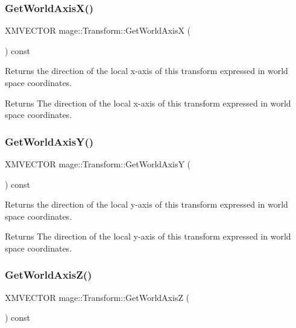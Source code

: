 \subsubsection{\texorpdfstring{Get\+World\+Axis\+X()}{GetWorldAxisX()}}
{\footnotesize\ttfamily X\+M\+V\+E\+C\+T\+OR mage\+::\+Transform\+::\+Get\+World\+AxisX (\begin{DoxyParamCaption}{ }\end{DoxyParamCaption}) const}

Returns the direction of the local x-\/axis of this transform expressed in world space coordinates.

\begin{DoxyReturn}{Returns}
The direction of the local x-\/axis of this transform expressed in world space coordinates. 
\end{DoxyReturn}
\hypertarget{structmage_1_1_transform_a9c4452fa4aefb48e4e6c9a4a38fac32c}{}\label{structmage_1_1_transform_a9c4452fa4aefb48e4e6c9a4a38fac32c} 
\subsubsection{\texorpdfstring{Get\+World\+Axis\+Y()}{GetWorldAxisY()}}
{\footnotesize\ttfamily X\+M\+V\+E\+C\+T\+OR mage\+::\+Transform\+::\+Get\+World\+AxisY (\begin{DoxyParamCaption}{ }\end{DoxyParamCaption}) const}

Returns the direction of the local y-\/axis of this transform expressed in world space coordinates.

\begin{DoxyReturn}{Returns}
The direction of the local y-\/axis of this transform expressed in world space coordinates. 
\end{DoxyReturn}
\hypertarget{structmage_1_1_transform_a580b65d46b4af8086fab60d0737fd353}{}\label{structmage_1_1_transform_a580b65d46b4af8086fab60d0737fd353} 
\subsubsection{\texorpdfstring{Get\+World\+Axis\+Z()}{GetWorldAxisZ()}}
{\footnotesize\ttfamily X\+M\+V\+E\+C\+T\+OR mage\+::\+Transform\+::\+Get\+World\+AxisZ (\begin{DoxyParamCaption}{ }\end{DoxyParamCaption}) const}


